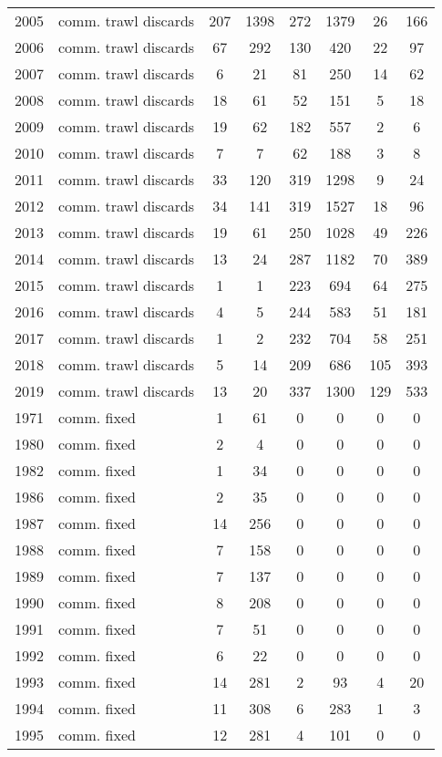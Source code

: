 \begin{longtable}[t]{c>{\centering\arraybackslash}p{3cm}cccccc}
2005 & comm. trawl discards & 207 & 1398 & 272 & 1379 & 26 & 166\\
2006 & comm. trawl discards & 67 & 292 & 130 & 420 & 22 & 97\\
2007 & comm. trawl discards & 6 & 21 & 81 & 250 & 14 & 62\\
2008 & comm. trawl discards & 18 & 61 & 52 & 151 & 5 & 18\\
2009 & comm. trawl discards & 19 & 62 & 182 & 557 & 2 & 6\\
2010 & comm. trawl discards & 7 & 7 & 62 & 188 & 3 & 8\\
2011 & comm. trawl discards & 33 & 120 & 319 & 1298 & 9 & 24\\
2012 & comm. trawl discards & 34 & 141 & 319 & 1527 & 18 & 96\\
2013 & comm. trawl discards & 19 & 61 & 250 & 1028 & 49 & 226\\
2014 & comm. trawl discards & 13 & 24 & 287 & 1182 & 70 & 389\\
2015 & comm. trawl discards & 1 & 1 & 223 & 694 & 64 & 275\\
2016 & comm. trawl discards & 4 & 5 & 244 & 583 & 51 & 181\\
2017 & comm. trawl discards & 1 & 2 & 232 & 704 & 58 & 251\\
2018 & comm. trawl discards & 5 & 14 & 209 & 686 & 105 & 393\\
2019 & comm. trawl discards & 13 & 20 & 337 & 1300 & 129 & 533\\
1971 & comm. fixed & 1 & 61 & 0 & 0 & 0 & 0\\
1980 & comm. fixed & 2 & 4 & 0 & 0 & 0 & 0\\
1982 & comm. fixed & 1 & 34 & 0 & 0 & 0 & 0\\
1986 & comm. fixed & 2 & 35 & 0 & 0 & 0 & 0\\
1987 & comm. fixed & 14 & 256 & 0 & 0 & 0 & 0\\
1988 & comm. fixed & 7 & 158 & 0 & 0 & 0 & 0\\
1989 & comm. fixed & 7 & 137 & 0 & 0 & 0 & 0\\
1990 & comm. fixed & 8 & 208 & 0 & 0 & 0 & 0\\
1991 & comm. fixed & 7 & 51 & 0 & 0 & 0 & 0\\
1992 & comm. fixed & 6 & 22 & 0 & 0 & 0 & 0\\
1993 & comm. fixed & 14 & 281 & 2 & 93 & 4 & 20\\
1994 & comm. fixed & 11 & 308 & 6 & 283 & 1 & 3\\
1995 & comm. fixed & 12 & 281 & 4 & 101 & 0 & 0\\

\end{longtable}
